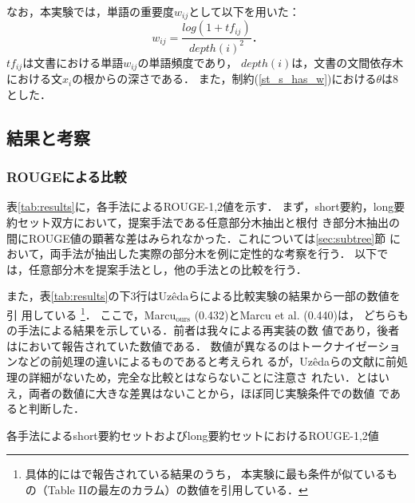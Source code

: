 \documentclass[japanese]{jnlp_1.4}
\begin{document}
なお，本実験では，単語の重要度$w_{ij}$として以下を用いた：
\begin{equation}
 w_{ij} = \frac{log( 1 + tf_{ij})}{depth(i)^2}．
\end{equation}
$tf_{ij}$は文書における単語$w_{ij}$の単語頻度であり，
$depth(i)$は，文書の文間依存木における文$x_i$の根からの深さである．
また，制約(\ref{st_s_has_w})における$\theta$は8とした．


\subsection{結果と考察}

\subsubsection{ROUGEによる比較}
\label{sec:rouge}

表\ref{tab:results}に，各手法によるROUGE-1,2値を示す．
まず，short要約，long要約セット双方において，提案手法である任意部分木抽出と根付
き部分木抽出の間にROUGE値の顕著な差はみられなかった．これについては\ref{sec:subtree}節
において，両手法が抽出した実際の部分木を例に定性的な考察を行う．
以下では，任意部分木を提案手法とし，他の手法との比較を行う．

また，表\ref{tab:results}の下3行はUz\^{e}daらによる比較実験の結果から一部の数値を引
用している
\footnote{\protect 具体的には\cite{uzeda:10}で報告されている結果のうち，
本実験に最も条件が似ているもの（Table IIの最左のカラム）の数値を引用している．
}．
ここで，Marcu$_\text{ours}$ (0.432)とMarcu et al. (0.440)は，
どちらも\cite{marcu:98}の手法による結果を示している．前者は我々による再実装の数
値であり，後者は\cite{uzeda:10}において報告されていた数値である．
数値が異なるのはトークナイゼーションなどの前処理の違いによるものであると考えられ
るが，Uz\^{e}daらの文献に前処理の詳細がないため，完全な比較とはならないことに注意さ
れたい．とはいえ，両者の数値に大きな差異はないことから，ほぼ同じ実験条件での数値
であると判断した．

\begin{table}[t]
\caption{各手法によるshort要約セットおよびlong要約セットにおけるROUGE-1,2値}
\label{tab:results}

\end{table}
\end{document}
